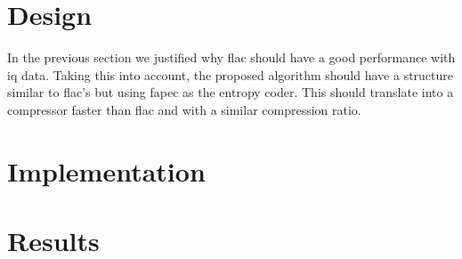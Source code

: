 \section{Design}

In the previous section we justified why \acrshort{flac} should have a good performance with \acrshort{iq} data. Taking this into account, the proposed algorithm should have a structure similar to \acrshort{flac}'s but using \acrshort{fapec} as the entropy coder. This should translate into a compressor faster than \acrshort{flac} and with a similar compression ratio.

\section{Implementation}

\section{Results}

